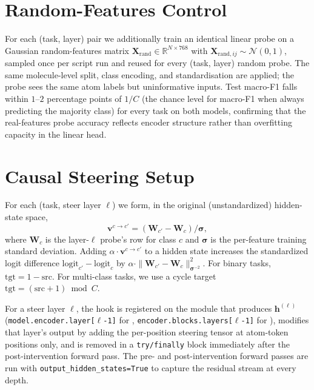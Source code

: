 \section{Random-Features Control}
\label{app:random}

For each (task, layer) pair we additionally train an identical linear probe on a Gaussian random-features matrix $\mathbf{X}_{\mathrm{rand}} \in \mathbb{R}^{N \times 768}$ with $\mathbf{X}_{\mathrm{rand}, ij} \sim \mathcal{N}(0, 1)$, sampled once per script run and reused for every (task, layer) random probe. The same molecule-level split, class encoding, and standardisation are applied; the probe sees the same atom labels but uninformative inputs. Test macro-F1 falls within $1$--$2$ percentage points of $1/C$ (the chance level for macro-F1 when always predicting the majority class) for every task on both models, confirming that the real-features probe accuracy reflects encoder structure rather than overfitting capacity in the linear head.

\section{Causal Steering Setup}
\label{app:steering}



 For each (task, steer layer $\ell$) we form, in the original (unstandardized) hidden-state space,
\[
\mathbf{v}^{c \to c'} = (\mathbf{W}_{c'} - \mathbf{W}_{c}) / \boldsymbol{\sigma},
\]
where $\mathbf{W}_{c}$ is the layer-$\ell$ probe's row for class $c$ and $\boldsymbol{\sigma}$ is the per-feature training standard deviation. Adding $\alpha \cdot \mathbf{v}^{c \to c'}$ to a hidden state increases the standardized logit difference $\mathrm{logit}_{c'} - \mathrm{logit}_{c}$ by $\alpha \cdot \|\mathbf{W}_{c'} - \mathbf{W}_c\|_{\boldsymbol{\sigma}^{-2}}^2$. For binary tasks, $\mathrm{tgt} = 1 - \mathrm{src}$. For multi-class tasks, we use a cycle target $\mathrm{tgt} = (\mathrm{src} + 1) \bmod C$.

 For a steer layer $\ell$, the hook is registered on the module that produces $\mathbf{h}^{(\ell)}$ (\texttt{model.encoder.layer[$\ell$-1]} for \molm, \texttt{encoder.blocks.layers[$\ell$-1]} for \smi), modifies that layer's output by adding the per-position steering tensor at atom-token positions only, and is removed in a \texttt{try/finally} block immediately after the post-intervention forward pass. The pre- and post-intervention forward passes are run with \texttt{output\_hidden\_states=True} to capture the residual stream at every depth.

